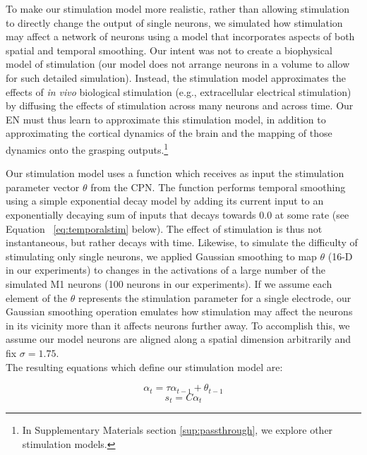 \documentclass[12pt]{iopart}
\begin{document}
To make our stimulation model more realistic, rather than allowing stimulation to directly change the
output of single neurons, we simulated how stimulation may affect a network of neurons using a
model that incorporates aspects of both spatial and temporal smoothing. Our intent was not to create a
biophysical model of stimulation (our model does not arrange neurons in a volume to allow for such detailed
simulation). Instead, the stimulation model approximates the effects of \textit{in vivo} biological
stimulation (e.g., extracellular electrical stimulation) by diffusing the effects of stimulation across
many neurons and across time. Our EN must thus learn to approximate this stimulation model,
in addition to approximating the cortical dynamics of the brain and the mapping of those dynamics onto
the grasping outputs.\footnote{In Supplementary Materials section \ref{sup:passthrough}, we explore  
other stimulation models.}

Our stimulation model uses a function which receives as input the stimulation parameter
vector $\theta$ from the CPN. The function performs temporal smoothing using a simple exponential decay model by
adding its current input to an exponentially decaying sum of inputs that decays towards $0.0$ at some
rate (see Equation ~\ref{eq:temporalstim} below). The effect of stimulation is thus not instantaneous,
but rather decays with time. Likewise, to simulate the difficulty of stimulating only single neurons,
we applied Gaussian smoothing to map $\theta$ (16-D in our experiments) to changes in the activations of
a large number of the simulated M1 neurons (100 neurons in our experiments). If we assume each element
of the $\theta$ represents the stimulation parameter for a single electrode, our Gaussian smoothing
operation emulates how stimulation may affect the neurons in its vicinity more than it affects neurons
further away. To accomplish this, we assume our model neurons are aligned along a spatial dimension
arbitrarily and fix $\sigma=1.75$.\\

\noindent The resulting equations which define our stimulation model are:

\begin{equation}
\alpha_{t} = \tau\alpha_{t-1} + \theta_{t-1} \label{eq:temporalstim}
\end{equation}
\begin{equation}
s_{t} = C\alpha_{t}
\end{equation}
\end{document}
